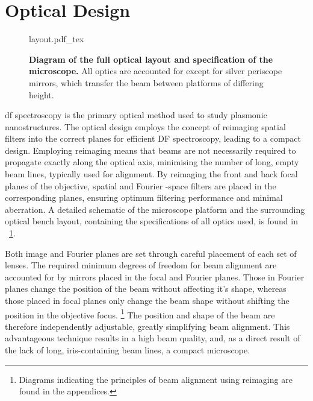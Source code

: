 \documentclass{article}
\begin{document}
\section{Optical Design}
\label{sec:optical_design}

\begin{figure}[p]
\centering
\fontsize{9.5pt}{1em}\selectfont
\def\svgwidth{0.93\textwidth}
{layout.pdf_tex}
\caption[Diagram of the full optical layout]{\textbf{Diagram of the full optical layout and specification of the microscope.} All optics are accounted for except for silver periscope mirrors, which transfer the beam between platforms of differing height.}
\label{fig:layout}
\end{figure}

\Gls{df} spectroscopy is the primary optical method used to study plasmonic nanostructures. The optical design employs the concept of reimaging spatial filters into the correct planes for efficient DF spectroscopy, leading to a compact design. Employing reimaging means that beams are not necessarily required to propagate exactly along the optical axis, minimising the number of long, empty beam lines, typically used for alignment. By reimaging the front and back focal planes of the objective, spatial and Fourier \wvm-space filters are placed in the corresponding planes, ensuring optimum filtering performance and minimal aberration. A detailed schematic of the microscope platform and the surrounding optical bench layout, containing the specifications of all optics used, is found in \figurename~\ref{fig:layout}.

Both image and Fourier planes are set through careful placement of each set of lenses. The required minimum degrees of freedom for beam alignment are accounted for by mirrors placed in the focal and Fourier planes. Those in Fourier planes change the position of the beam without affecting it's shape, whereas those placed in focal planes only change the beam shape without shifting the position in the objective focus.%
\footnote{Diagrams indicating the principles of beam alignment using reimaging are found in the appendices.}
The position and shape of the beam are therefore independently adjustable, greatly simplifying beam alignment. This advantageous technique results in a high beam quality, and, as a direct result of the lack of long, iris-containing beam lines, a compact microscope.
\end{document}
